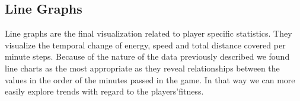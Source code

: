 \documentclass{article}
\begin{document}
\subsection{Line Graphs}
Line graphs are the final visualization related to player specific statistics. They visualize the temporal change of energy, speed and total distance covered per minute steps. Because of the nature of the data previously described we found line charts as the most appropriate as they reveal relationships between the values in the order of the minutes passed in the game. In that way we can more easily explore trends with regard to the players\textquoteright fitness.



\end{document}
